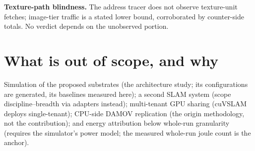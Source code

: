 \textbf{Texture-path blindness.} The address tracer does not observe
texture-unit fetches; image-tier traffic is a stated lower bound,
corroborated by counter-side totals. No verdict depends on the unobserved
portion.

\section{What is out of scope, and why}

Simulation of the proposed substrates (the architecture study; its
configurations are generated, its baselines measured here); a second SLAM
system (scope discipline--breadth via adapters instead); multi-tenant GPU
sharing (cuVSLAM deploys single-tenant); CPU-side DAMOV replication (the
origin methodology, not the contribution); and energy attribution below
whole-run granularity (requires the simulator's power model; the measured
whole-run joule count is the anchor).
